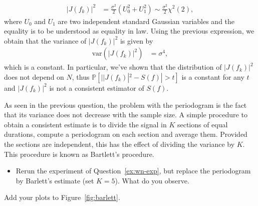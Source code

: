 \documentclass[11pt]{article}
\begin{document}
\begin{solution}
\begin{equation}
        \begin{split}
            |J(f_k)|^2 &= \frac{\sigma^2}{2}(U_0^2 + U_1^2)\sim \frac{\sigma^2}{2}\chi^2(2),
        \end{split}
    \end{equation}
    where $U_0$ and $U_1$ are two independent standard Gaussian variables and the equality is to be understood as equality in law.
    Using the previous expression, we obtain that the variance of $|J(f_k)|^2$ is given by
    \begin{equation}
        \begin{split}
            \text{var}(|J(f_k)|^2) &= \sigma^4,
        \end{split}
    \end{equation}
    which is a constant. In particular, we've shown that the distribution of $|J(f_k)|^2$ does not depend on $N$, thus $ \mathbb{P}[||J(f_k)|^2-S(f)|>t]$ is a constant for any $t$ and $|J(f_k)|^2$ is not a consistent estimator of $S(f)$.
\end{solution}

\begin{exercise}\label{q:barlett}
    As seen in the previous question, the problem with the periodogram is the fact that its variance does not decrease with the sample size.
    A simple procedure to obtain a consistent estimate is to divide the signal in $K$ sections of equal durations, compute a periodogram on each section and average them.
    Provided the sections are independent, this has the effect of dividing the variance by $K$.
    This procedure is known as Bartlett's procedure.
    \begin{itemize}
        \item Rerun the experiment of Question~\ref{ex:wn-exp}, but replace the periodogram by Barlett's estimate (set $K=5$). What do you observe.
    \end{itemize}
    Add your plots to Figure~\ref{fig:barlett}.
\end{exercise}
\end{document}

